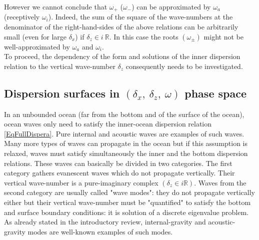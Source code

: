 \documentclass[a4paper,11pt]{article}
\begin{document}
However we cannot conclude that $\omega_+$ ($\omega_-$) can be approximated by $\omega_a$ (receptively $\omega_i$). Indeed, the sum of the square of the wave-numbers at the denominator of the right-hand-sides of the above relations can be arbitrarily small (even for large $\delta_x$) if $\delta_z\in i \ \mathbb{R}$. In this case the roots $(\omega_\pm)$ might not be well-approximated by $\omega_a$ and $\omega_i$.\\
To proceed, the dependency of the form and solutions of the inner dispersion relation to the vertical wave-number $\delta_z$ consequently needs to be investigated.

\subsection{Dispersion surfaces in $(\delta_x,\ \delta_z,\ \omega)$ phase space}
\label{SubSectionDispSurfIntro}

In an unbounded ocean (far from the bottom and of the surface of the ocean), ocean waves only need to satisfy the inner-ocean dispersion relation \ref{EqFullDispera}. Pure internal and acoustic waves are examples of such waves. Many more types of waves can propagate in the ocean but if this assumption is relaxed, waves must satisfy simultaneously the inner and the bottom dispersion relations. These waves can basically be divided in two categories. The first category gathers evanescent waves which do not propagate vertically. Their vertical wave-number is a pure-imaginary complex $(\delta_z\in i\mathbb{R})$. Waves from the second category are usually called "wave modes": they do not propagate vertically either but their vertical wave-number must be "quantified" to satisfy the bottom and surface boundary conditions: it is solution of a discrete eigenvalue problem. As already stated in the introductory review, internal-gravity and acoustic-gravity modes are well-known examples of such modes.\\
\end{document}

